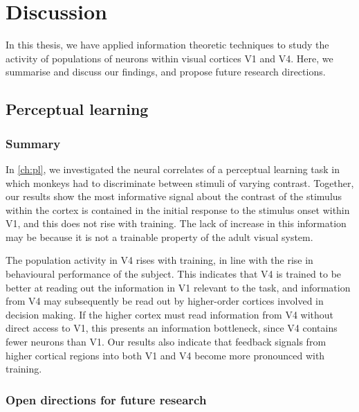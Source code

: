 \chapter{Discussion}
\label{ch:discussion}

In this thesis, we have applied information theoretic techniques to study the activity of populations of neurons within visual cortices \ac{V1} and \ac{V4}.
Here, we summarise and discuss our findings, and propose future research directions.


\section{Perceptual learning}

\subsection{Summary}

In \autoref{ch:pl}, we investigated the neural correlates of a perceptual learning task in which monkeys had to discriminate between stimuli of varying contrast.
Together, our results show the most informative signal about the contrast of the stimulus within the cortex is contained in the initial response to the stimulus onset within \ac{V1}, and this does not rise with training.
The lack of increase in this information may be because it is not a trainable property of the adult visual system.

The population activity in \ac{V4} rises with training, in line with the rise in behavioural performance of the subject.
This indicates that \ac{V4} is trained to be better at reading out the information in \ac{V1} relevant to the task, and information from \ac{V4} may subsequently be read out by higher-order cortices involved in decision making.
If the higher cortex must read information from \ac{V4} without direct access to \ac{V1}, this presents an information bottleneck, since \ac{V4} contains fewer neurons than \ac{V1}.
Our results also indicate that feedback signals from higher cortical regions into both \ac{V1} and \ac{V4} become more pronounced with training.


\subsection{Open directions for future research}

